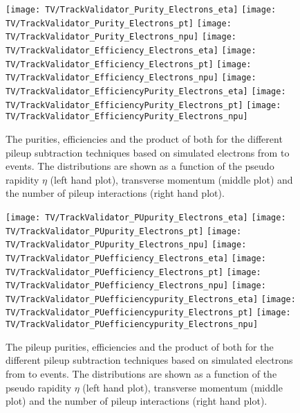 \begin{figure}[h!t]
  \centering
  \texttt{[image: TV/TrackValidator\_Purity\_Electrons\_eta]}
  \texttt{[image: TV/TrackValidator\_Purity\_Electrons\_pt]}
  \texttt{[image: TV/TrackValidator\_Purity\_Electrons\_npu]}
  \newline
  \texttt{[image: TV/TrackValidator\_Efficiency\_Electrons\_eta]}
  \texttt{[image: TV/TrackValidator\_Efficiency\_Electrons\_pt]}
  \texttt{[image: TV/TrackValidator\_Efficiency\_Electrons\_npu]}
  \newline
  \texttt{[image: TV/TrackValidator\_EfficiencyPurity\_Electrons\_eta]}
  \texttt{[image: TV/TrackValidator\_EfficiencyPurity\_Electrons\_pt]}
  \texttt{[image: TV/TrackValidator\_EfficiencyPurity\_Electrons\_npu]}
  \caption[Purity, efficiency and their product for the different pileup subtraction techniques based on simulated electrons from \Zz to \EE events]{The purities, efficiencies and the product of both for the different pileup subtraction techniques based on simulated electrons from \Zz to \EE events. The distributions are shown as a function of the pseudo rapidity $\eta$ (left hand plot), transverse momentum (middle plot) and the number of pileup interactions (right hand plot). \label{plot:TACOAElSignal}}
\end{figure}

\begin{figure}[h!t]
  \centering
  \texttt{[image: TV/TrackValidator\_PUpurity\_Electrons\_eta]}
  \texttt{[image: TV/TrackValidator\_PUpurity\_Electrons\_pt]}
  \texttt{[image: TV/TrackValidator\_PUpurity\_Electrons\_npu]}
  \newline
  \texttt{[image: TV/TrackValidator\_PUefficiency\_Electrons\_eta]}
  \texttt{[image: TV/TrackValidator\_PUefficiency\_Electrons\_pt]}
  \texttt{[image: TV/TrackValidator\_PUefficiency\_Electrons\_npu]}
  \newline
  \texttt{[image: TV/TrackValidator\_PUefficiencypurity\_Electrons\_eta]}
  \texttt{[image: TV/TrackValidator\_PUefficiencypurity\_Electrons\_pt]}
  \texttt{[image: TV/TrackValidator\_PUefficiencypurity\_Electrons\_npu]}
  \caption[Pileup purity, efficiency and their product for the different pileup subtraction techniques based on simulated electrons from \Zz to \EE events]{The pileup purities, efficiencies and the product of both for the different pileup subtraction techniques based on simulated electrons from \Zz to \EE events. The distributions are shown as a function of the pseudo rapidity $\eta$ (left hand plot), transverse momentum (middle plot) and the number of pileup interactions (right hand plot). \label{plot:TACOAElPileup}}
\end{figure}




